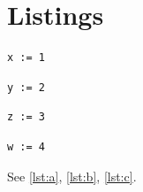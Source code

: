 \documentclass{article}
\begin{document}
\lstlistoflistings
\section{Listings}
\begin{lstlisting}[caption={A listing},label={lst:a}]
x := 1
\end{lstlisting}
\begin{lstlisting}[caption={[Short]Listing with short entry},label={lst:b}]
y := 2
\end{lstlisting}
\begin{lstlisting}[title={Untitled title only}]
z := 3
\end{lstlisting}
\begin{lstlisting}[caption={Below listing},captionpos=b,label={lst:c}]
w := 4
\end{lstlisting}
See \ref{lst:a}, \ref{lst:b}, \ref{lst:c}.
\end{document}
